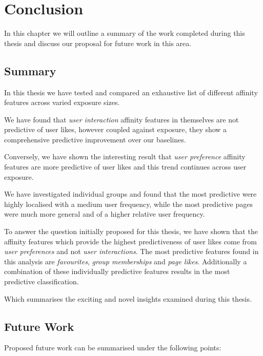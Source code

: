 
\chapter{Conclusion}
\label{cha:conc}

In this chapter we will outline a summary of the work completed during this thesis and discuss our proposal for future work in this area.

\section{Summary}
\label{sec:conc}

In this thesis we have tested and compared an exhaustive list of different affinity features across varied exposure sizes.

We have found that \emph{user interaction} affinity features in themselves are not predictive of user likes, however coupled against 
exposure, they show a comprehensive predictive improvement over our baselines.

Conversely, we have shown the interesting result that \emph{user preference} affinity features are more predictive of user likes
and this trend continues across user exposure.

We have investigated individual groups and found that the most predictive were highly localised with a medium
user frequency, while the most predictive pages were much more general and of a higher relative user frequency.

To answer the question initially proposed for this thesis, we have shown that the affinity features which provide the highest predictiveness of user likes come from \emph{user preferences} and not
\emph{user interactions}. The most predictive features found in this analysis are \emph{favourites}, \emph{group memberships} 
and \emph{page likes}. Additionally a combination of these individually predictive features results in the most predictive classification.

Which summarises the exciting and novel insights examined during this thesis.

\section{Future Work}
\label{sec:ftw}

Proposed future work can be summarised under the following points:

